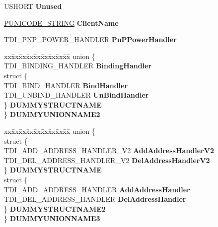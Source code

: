 \begin{DoxyCompactItemize}
\begin{tabbing}
\end{tabbing}\item 
\mbox{\label{struct___t_d_i20___c_l_i_e_n_t___i_n_t_e_r_f_a_c_e___i_n_f_o_a45430f46576764b05e04fca179882e21}} 
U\+S\+H\+O\+RT {\bfseries Unused}
\item 
\mbox{\label{struct___t_d_i20___c_l_i_e_n_t___i_n_t_e_r_f_a_c_e___i_n_f_o_a71fe511f83e40b00ba5144c74aa76b18}} 
\hyperlink{struct___u_n_i_c_o_d_e___s_t_r_i_n_g}{P\+U\+N\+I\+C\+O\+D\+E\+\_\+\+S\+T\+R\+I\+NG} {\bfseries Client\+Name}
\item 
\mbox{\label{struct___t_d_i20___c_l_i_e_n_t___i_n_t_e_r_f_a_c_e___i_n_f_o_a33d28604ba4a735b75e6401c0241145e}} 
T\+D\+I\+\_\+\+P\+N\+P\+\_\+\+P\+O\+W\+E\+R\+\_\+\+H\+A\+N\+D\+L\+ER {\bfseries Pn\+P\+Power\+Handler}
\item 
\mbox{\label{struct___t_d_i20___c_l_i_e_n_t___i_n_t_e_r_f_a_c_e___i_n_f_o_ab148bb911859171d1d2f87dd3e708917}} 
\begin{tabbing}
xx\=xx\=xx\=xx\=xx\=xx\=xx\=xx\=xx\=\kill
union \{\\
\>TDI\_BINDING\_HANDLER {\bfseries BindingHandler}\\
\>struct \{\\
\>\>TDI\_BIND\_HANDLER {\bfseries BindHandler}\\
\>\>TDI\_UNBIND\_HANDLER {\bfseries UnBindHandler}\\
\>\} {\bfseries DUMMYSTRUCTNAME}\\
\} {\bfseries DUMMYUNIONNAME2}\\

\end{tabbing}\item 
\mbox{\label{struct___t_d_i20___c_l_i_e_n_t___i_n_t_e_r_f_a_c_e___i_n_f_o_a9128458e24ecbd1cc35f77fae278d5a8}} 
\begin{tabbing}
xx\=xx\=xx\=xx\=xx\=xx\=xx\=xx\=xx\=\kill
union \{\\
\>struct \{\\
\>\>TDI\_ADD\_ADDRESS\_HANDLER\_V2 {\bfseries AddAddressHandlerV2}\\
\>\>TDI\_DEL\_ADDRESS\_HANDLER\_V2 {\bfseries DelAddressHandlerV2}\\
\>\} {\bfseries DUMMYSTRUCTNAME}\\
\>struct \{\\
\>\>TDI\_ADD\_ADDRESS\_HANDLER {\bfseries AddAddressHandler}\\
\>\>TDI\_DEL\_ADDRESS\_HANDLER {\bfseries DelAddressHandler}\\
\>\} {\bfseries DUMMYSTRUCTNAME2}\\
\} {\bfseries DUMMYUNIONNAME3}\\


\end{tabbing}
\end{DoxyCompactItemize}
